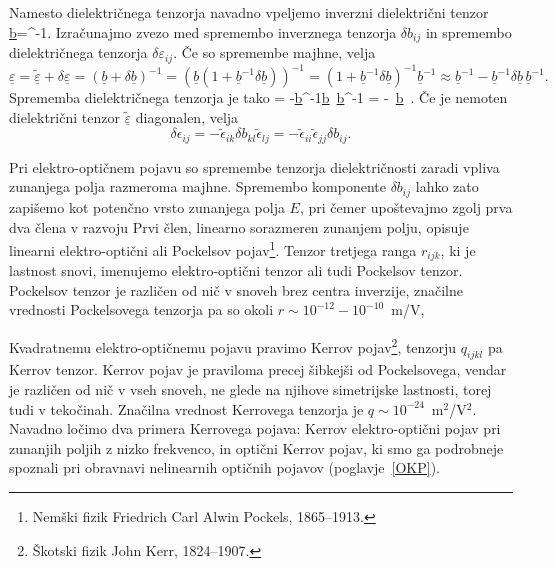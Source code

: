Namesto dielektričnega tenzorja navadno vpeljemo inverzni dielektrični tenzor
\beq
\underline{b}=\underline{\epsilon}^{-1}.
\eeq
Izračunajmo zvezo med spremembo inverznega tenzorja $\delta b_{ij}$ 
in spremembo dielektričnega tenzorja $\delta \varepsilon_{ij}$. 
Če so spremembe majhne, velja 
\begin{equation}
\underline{\varepsilon} = \underline{\tilde{\varepsilon}} + \delta \underline{\varepsilon}=
(\underline{b}+\delta \underline{b})^{-1}=\left(\underline{b}(1+\underline{b}^{-1}
\delta \underline{b})\right)^{-1}=(1+\underline{b}^{-1}\delta \underline{b})^{-1}\underline{b}^{-1}
\approx \underline{b}^{-1}-\underline{b}^{-1}\delta \underline{b}\, \underline{b}^{-1}.
\label{7.2}
\end{equation}
Sprememba dielektričnega tenzorja je tako
\beq
 \delta \underline{\varepsilon}= -\underline{b}^{-1}\delta \underline{b}\, \underline{b}^{-1}
 = -\underline{\tilde{\varepsilon}}\, \delta \underline{b}\, \underline{\tilde{\varepsilon}}.
\eeq
Če je nemoten dielektrični tenzor $\underline{\tilde{\varepsilon}}$ diagonalen, velja
\begin{equation}
\delta\epsilon_{ij}=-\tilde{\epsilon}_{ik}\delta b_{kl}\tilde{\epsilon}_{lj}
=-\tilde{\epsilon}_{ii}\tilde{\epsilon}_{jj}\delta b_{ij}.
\label{7.3}
\end{equation}

Pri elektro-optičnem pojavu so spremembe tenzorja dielektričnosti zaradi vpliva zunanjega polja razmeroma 
majhne. Spremembo komponente $\delta b_{ij}$ lahko zato zapišemo kot potenčno vrsto zunanjega polja $E$, 
pri čemer upoštevajmo zgolj prva dva člena v razvoju
Prvi člen, linearno sorazmeren zunanjem polju, opisuje linearni elektro-optični
ali Pockelsov pojav\footnote{Nemški fizik Friedrich Carl Alwin Pockels, 1865--1913.}. 
Tenzor tretjega ranga $r_{ijk}$, ki je lastnost snovi, imenujemo elektro-optični 
tenzor
ali tudi Pockelsov tenzor. 
Pockelsov tenzor je različen od nič v snoveh brez centra inverzije, značilne vrednosti Pockelsovega
tenzorja pa so okoli $r \sim 10^{-12} - 10^{-10}$~m/V,

Kvadratnemu elektro-optičnemu pojavu pravimo Kerrov
pojav\footnote{Škotski fizik John Kerr, 1824--1907.}, tenzorju $q_{ijkl}$ pa Kerrov tenzor. 
Kerrov pojav je praviloma precej šibkejši od Pockelsovega, vendar je različen od nič v vseh snoveh, ne glede na
njihove simetrijske lastnosti, torej tudi v tekočinah. 
Značilna vrednost Kerrovega tenzorja je $q \sim 10^{-24}$~m$^2$/V$^2$. Navadno ločimo dva primera Kerrovega
pojava: Kerrov elektro-optični pojav pri zunanjih poljih z nizko frekvenco, in optični Kerrov pojav, ki smo 
ga podrobneje spoznali pri obravnavi nelinearnih optičnih pojavov (poglavje~\ref{OKP}).

